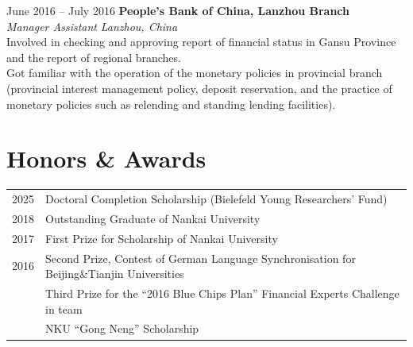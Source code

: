 \documentclass[a4paper,12pt]{article}
\makeatletter
\newenvironment{joblong}[2]
    {
    \begin{tabularx}{\linewidth}{@{}l X r@{}}
    \textbf{#1} & \hfill &  #2 \\[3.75pt]
    \end{tabularx}
    \begin{minipage}[t]{\linewidth}
    \begin{itemize}[nosep,after=\strut, leftmargin=1em, itemsep=3pt,label=--]
    }
    {
    \end{itemize}
    \end{minipage}    
    }
\makeatother
\begin{document}
June 2016 -- July 2016 \hfill \textbf{People’s Bank of China, Lanzhou Branch} \\
\textit{Manager Assistant} \hfill \textit{Lanzhou, China} \\
\textbullet Involved in checking and approving report of financial status in Gansu Province and the report of regional branches. \\
\textbullet Got familiar with the operation of the monetary policies in provincial branch (provincial interest management policy, deposit reservation, and the practice of monetary policies such as relending and standing lending facilities).







  

\section{Honors \& Awards}
\begin{tabularx}{\linewidth}{@{}l X@{}}
2025 & \hfill Doctoral Completion Scholarship (Bielefeld Young Researchers’ Fund) \\

2018 & \hfill Outstanding Graduate of Nankai University \\

2017 & \hfill First Prize for Scholarship of Nankai University \\

2016 & \hfill Second Prize, Contest of German Language Synchronisation for Beijing\&Tianjin Universities \\

& \hfill Third Prize for the “2016 Blue Chips Plan” Financial Experts Challenge in team \\

& \hfill NKU “Gong Neng” Scholarship \\

\end{tabularx}
\end{document}
